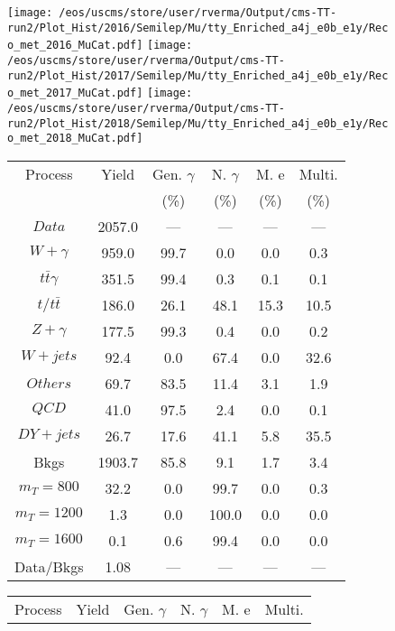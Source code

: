 \begin{figure}
\centering
\texttt{[image: /eos/uscms/store/user/rverma/Output/cms-TT-run2/Plot\_Hist/2016/Semilep/Mu/tty\_Enriched\_a4j\_e0b\_e1y/Reco\_met\_2016\_MuCat.pdf]}
\texttt{[image: /eos/uscms/store/user/rverma/Output/cms-TT-run2/Plot\_Hist/2017/Semilep/Mu/tty\_Enriched\_a4j\_e0b\_e1y/Reco\_met\_2017\_MuCat.pdf]}
\texttt{[image: /eos/uscms/store/user/rverma/Output/cms-TT-run2/Plot\_Hist/2018/Semilep/Mu/tty\_Enriched\_a4j\_e0b\_e1y/Reco\_met\_2018\_MuCat.pdf]}
\begin{minipage}[c]{0.32\textwidth}
\centering
\tiny{
\begin{tabular}{cccccc}
\hline
Process & Yield & Gen. $\gamma$ & N. $\gamma$ & M. e & Multi. \\
 &  & (\%) & (\%) & (\%) & (\%)  \\
\hline
                                                                      $ Data $ &  2057.0 &  --- &  --- &  --- &  ---\\
$ W+\gamma $ &  959.0 &  99.7 &  0.0 &  0.0 &  0.3\\
$ t\bar{t}\gamma $ &  351.5 &  99.4 &  0.3 &  0.1 &  0.1\\
$ t/t\bar{t} $ &  186.0 &  26.1 &  48.1 &  15.3 &  10.5\\
$ Z+\gamma $ &  177.5 &  99.3 &  0.4 &  0.0 &  0.2\\
$ W+jets $ &  92.4 &  0.0 &  67.4 &  0.0 &  32.6\\
$ Others $ &  69.7 &  83.5 &  11.4 &  3.1 &  1.9\\
$ QCD $ &  41.0 &  97.5 &  2.4 &  0.0 &  0.1\\
$ DY+jets $ &  26.7 &  17.6 &  41.1 &  5.8 &  35.5\\
Bkgs &  1903.7 &  85.8 &  9.1 &  1.7 &  3.4\\
$ m_{T} = 800 $ &  32.2 &  0.0 &  99.7 &  0.0 &  0.3\\
$ m_{T} = 1200 $ &  1.3 &  0.0 &  100.0 &  0.0 &  0.0\\
$ m_{T} = 1600 $ &  0.1 &  0.6 &  99.4 &  0.0 &  0.0\\
Data/Bkgs &  1.08 &  --- &  --- &  --- &  ---\\
\hline
\end{tabular}
}
\end{minipage}
\begin{minipage}[c]{0.32\textwidth}
\centering
\tiny{
\begin{tabular}{cccccc}
\hline
Process & Yield & Gen. $\gamma$ & N. $\gamma$ & M. e & Multi. \\

\end{tabular}}
\end{minipage}
\end{figure}
